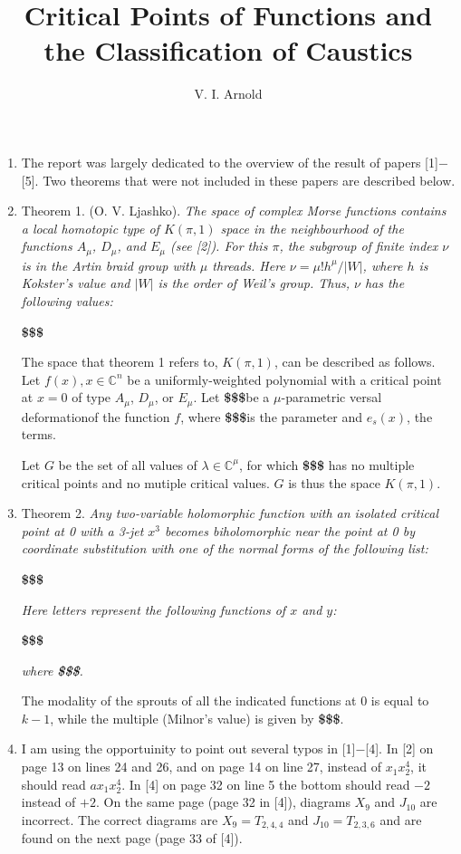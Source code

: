 \documentclass{article}
\renewcommand{\d}{\textbf{\$\$\$}}
\begin{document}
\date{}
\author{V. I. Arnold}
\title{Critical Points of Functions and the Classification of Caustics}
\maketitle
\begin{enumerate}
\item
The report was largely dedicated to the overview of the result of papers
[1]$-$[5].
Two theorems that were not included in these papers are described below.
\item
Theorem 1.
(O. V. Ljashko).
\textit{The space of complex Morse functions contains a local homotopic type of
$K(\pi,1)$ space in the neighbourhood of the functions $A_\mu$, $D_\mu$, and
$E_\mu$ (see [2]).
For this $\pi$, the subgroup of finite index $\nu$ is in the Artin braid group
with $\mu$ threads.
Here $\nu=\mu!h^\mu/|W|$, where $h$ is Kokster's value and $|W|$ is the order of
Weil's group.
Thus, $\nu$ has the following values:}

\d

The space that theorem 1 refers to, $K(\pi,1)$, can be described as follows.
Let $f(x),x\in\mathbb{C}^n$ be a uniformly-weighted polynomial with a critical
point at $x=0$ of type $A_\mu$, $D_\mu$, or $E_\mu$.
Let \d be a $\mu$-parametric versal deformationof the function $f$, where \d is
the parameter and $e_s(x)$, the terms.

Let $G$ be the set of all values of $\lambda\in\mathbb{C}^\mu$, for which \d
has no multiple critical points and no mutiple critical values.
$G$ is thus the space $K(\pi,1)$.
\item
Theorem 2.
\textit{Any two-variable holomorphic function with an isolated critical point at
0 with a 3-jet $x^3$ becomes biholomorphic near the point at 0 by coordinate
substitution with one of the normal forms of the following list:}

\d

\textit{Here letters represent the following functions of $x$ and $y$:}

\d

\textit{where \d.}

The modality of the sprouts of all the indicated functions at 0 is equal to
$k-1$, while the multiple (Milnor's value) is given by \d.
\item
I am using the opportuinity to point out several typos in [1]$-$[4].
In [2] on page 13 on lines 24 and 26, and on page 14 on line 27, instead of
$x_1x^4_2$, it should read $ax_1x^4_2$.
In [4] on page 32 on line 5 the bottom should read $-2$ instead of $+2$.
On the same page (page 32 in [4]), diagrams $X_9$ and $J_{10}$ are incorrect.
The correct diagrams are $X_9=T_{2,4,4}$ and $J_{10}=T_{2,3,6}$ and are found on
the next page (page 33 of [4]).


\end{enumerate}
\end{document}
